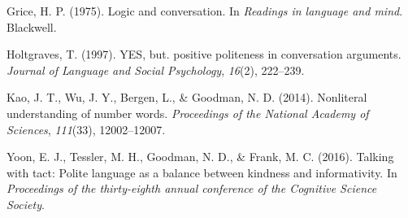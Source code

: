 \documentclass[10pt, letterpaper]{article}
\begin{document}
\hypertarget{ref-Grice1975}{}
Grice, H. P. (1975). Logic and conversation. In \emph{Readings in
language and mind}. Blackwell.

\hypertarget{ref-holtgraves1997}{}
Holtgraves, T. (1997). YES, but. positive politeness in conversation
arguments. \emph{Journal of Language and Social Psychology},
\emph{16}(2), 222--239.

\hypertarget{ref-Kao2014}{}
Kao, J. T., Wu, J. Y., Bergen, L., \& Goodman, N. D. (2014). Nonliteral
understanding of number words. \emph{Proceedings of the National Academy
of Sciences}, \emph{111}(33), 12002--12007.

\hypertarget{ref-yoon2016}{}
Yoon, E. J., Tessler, M. H., Goodman, N. D., \& Frank, M. C. (2016).
Talking with tact: Polite language as a balance between kindness and
informativity. In \emph{Proceedings of the thirty-eighth annual
conference of the Cognitive Science Society}.
\end{document}
